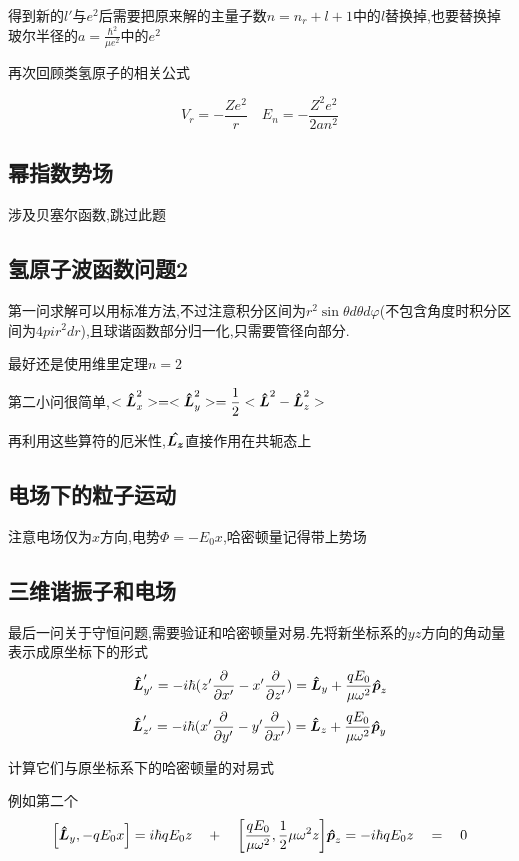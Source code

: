        得到新的$l'$与$e^{2}$后需要把原来解的主量子数$ n = n_{r} + l + 1$中的$l$替换掉,也要替换掉玻尔半径的$ a = \frac{\hbar^{2}}{\mu e^{2}} $中的$e^{2}$

        再次回顾类氢原子的相关公式

        $$ V_{r} = - \dfrac{Ze^{2}}{r}  \quad  E_{n} = - \dfrac{Z^{2}e^{2} }{2an^{2}} $$

        \subsection{幂指数势场}
            涉及贝塞尔函数,跳过此题
        
        \subsection{氢原子波函数问题2}
            第一问求解可以用标准方法,不过注意积分区间为$r^{2}\sin{\theta}d\theta d\varphi$(不包含角度时积分区间为$4pir^{2}dr$),且球谐函数部分归一化,只需要管径向部分.

            最好还是使用维里定理$n=2$

            第二小问很简单,$<\vu*{L}_{x}^{2}> = <\vu*{L}_{y}^{2}> = \dfrac{1}{2} < \vu*{L}^{2} - \vu*{L}_{z}^{2} > $

            再利用这些算符的厄米性,$\vu*{{L}_{z}}$直接作用在共轭态上
        
        \subsection{电场下的粒子运动}
            注意电场仅为$x$方向,电势$\Phi = - E_{0} x $,哈密顿量记得带上势场
        
        \subsection{三维谐振子和电场}
            最后一问关于守恒问题,需要验证和哈密顿量对易.先将新坐标系的$yz$方向的角动量表示成原坐标下的形式
            $$ \vu*{L}_{y'}' = -i\hbar (z' \pdv{x'} - x' \pdv{z'} ) = \vu*{L}_{y} + \dfrac{qE_{0}}{\mu \omega^{2}} \vu*{p}_{z} $$
            $$ \vu*{L}_{z'}' = -i\hbar (x' \pdv{y'} - y' \pdv{x'} ) = \vu*{L}_{z} + \dfrac{qE_{0}}{\mu \omega^{2}} \vu*{p}_{y} $$

            计算它们与原坐标系下的哈密顿量的对易式

            例如第二个
            $$ 
            \comm{\vu*{L}_{y}}{-qE_{0}x} = i\hbar q E_{0}z \quad + 
            \quad \comm{\frac{qE_{0}}{\mu \omega^{2}}}{ \frac{1}{2} \mu \omega^{2}z} \vu*{p}_{z} = -i \hbar q E_{0} z \quad  = \quad 0
            $$

